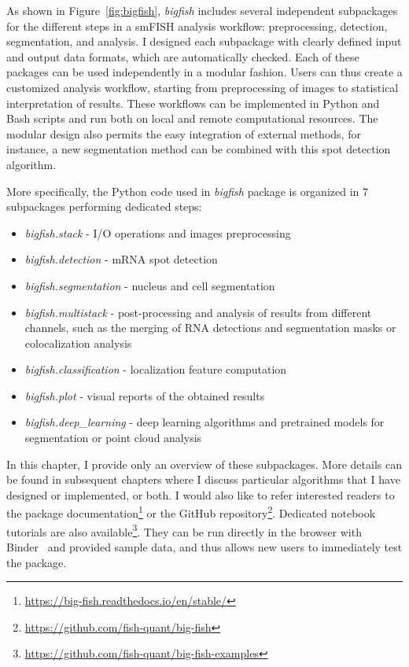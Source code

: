 As shown in Figure~\ref{fig:bigfish}, \emph{bigfish} includes several independent subpackages for the different steps in a \ac{smFISH} analysis workflow: preprocessing, detection, segmentation, and analysis.
I designed each subpackage with clearly defined input and output data formats, which are automatically checked.
Each of these packages can be used independently in a modular fashion.
Users can thus create a customized analysis workflow, starting from preprocessing of images to statistical interpretation of results.
These workflows can be implemented in Python and Bash scripts and run both on local and remote computational resources.
The modular design also permits the easy integration of external methods, for instance, a new segmentation method can be combined with this spot detection algorithm.

More specifically, the Python code used in \emph{bigfish} package is organized in 7 subpackages performing dedicated steps:
\begin{itemize}
	\setlength\itemsep{0.1em}
	\item \emph{bigfish.stack} - I/O operations and images preprocessing
	\item \emph{bigfish.detection} - \ac{mRNA} spot detection
	\item \emph{bigfish.segmentation} - nucleus and cell segmentation
	\item \emph{bigfish.multistack} - post-processing and analysis of results from different channels, such as the merging of \ac{RNA} detections and segmentation masks or colocalization analysis
	\item \emph{bigfish.classification} - localization feature computation
	\item \emph{bigfish.plot} - visual reports of the obtained results
	\item \emph{bigfish.deep\_learning} - deep learning algorithms and pretrained models for segmentation or point cloud analysis
\end{itemize}

In this chapter, I provide only an overview of these subpackages.
More details can be found in subsequent chapters where I discuss particular algorithms that I have designed or implemented, or both.
I would also like to refer interested readers to the package documentation\footnote{\url{https://big-fish.readthedocs.io/en/stable/}} or the GitHub repository\footnote{\url{https://github.com/fish-quant/big-fish}}.
Dedicated notebook tutorials are also available\footnote{\url{https://github.com/fish-quant/big-fish-examples}}.
They can be run directly in the browser with Binder~\cite{Jupyter2018Binder2} and provided sample data, and thus allows new users to immediately test the package.

